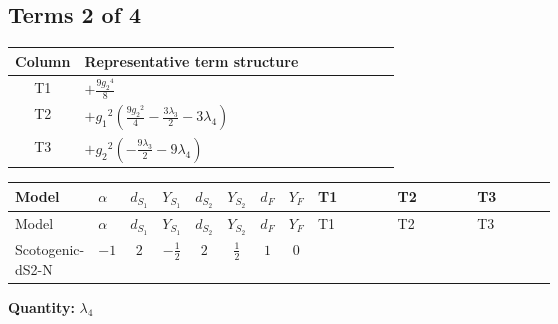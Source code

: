 \documentclass[8pt]{article}
\begin{document}
\begin{landscape}
\subsection*{Terms 2 of 4}
\begin{center}
\begin{tabular}{@{}c >{\raggedright\arraybackslash}p{0.82\linewidth}@{}}
\toprule
Column & Representative term structure \\
\midrule
T1 & \(\displaystyle +\frac{9 {g_2}^4}{8}\) \\
\midrule
T2 & \(\displaystyle +{g_1}^2 \left(\frac{9 {g_2}^2}{4}-\frac{3 {\lambda_3}}{2}-3 {\lambda_4}\right)\) \\
\midrule
T3 & \(\displaystyle +{g_2}^2 \left(-\frac{9 {\lambda_3}}{2}-9 {\lambda_4}\right)\) \\
\midrule
\bottomrule
\end{tabular}
\end{center}
\smallskip
\tiny
\begin{longtable}{@{}llcccccc >{\raggedright\arraybackslash}p{0.21\linewidth} >{\raggedright\arraybackslash}p{0.21\linewidth} >{\raggedright\arraybackslash}p{0.21\linewidth}@{}}
\toprule
Model & $\alpha$ & $d_{S_1}$ & $Y_{S_1}$ & $d_{S_2}$ & $Y_{S_2}$ & $d_F$ & $Y_F$ & T1 & T2 & T3 \\
\midrule
\endfirsthead
\toprule
Model & $\alpha$ & $d_{S_1}$ & $Y_{S_1}$ & $d_{S_2}$ & $Y_{S_2}$ & $d_F$ & $Y_F$ & T1 & T2 & T3 \\
\midrule
\endhead
Scotogenic-dS2-N & $-1$ & $2$ & $-\frac{1}{2}$ & $2$ & $\frac{1}{2}$ & $1$ & $0$ & \scriptsize\adjustbox{max width=\linewidth}{$\begin{gathered} +\frac{9 {g_2}^4}{8}\end{gathered}$} & \scriptsize\adjustbox{max width=\linewidth}{$\begin{gathered} +{g_1}^2 \left(\frac{9 {g_2}^2}{4}-\frac{3 {\lambda_3}}{2}-3 {\lambda_4}\right)\end{gathered}$} & \scriptsize\adjustbox{max width=\linewidth}{$\begin{gathered} +{g_2}^2 \left(-\frac{9 {\lambda_3}}{2}-9 {\lambda_4}\right)\end{gathered}$} \\
\midrule
\bottomrule
\end{longtable}
\clearpage
\noindent\textbf{Quantity: }$\lambda_4$\par\smallskip

\end{landscape}
\end{document}
